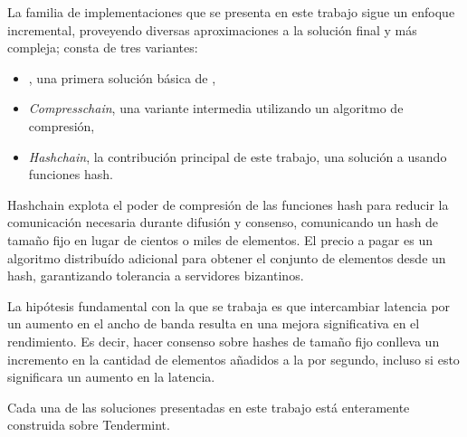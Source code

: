 %
%

La familia de implementaciones que se presenta en este trabajo
sigue un enfoque incremental, proveyendo diversas aproximaciones
a la solución final y más compleja; consta de tres variantes:
\begin{itemize}
  \item \textit{\vanilla}, una primera solución básica de \setchain,
  \item \textit{Compresschain}, una variante intermedia utilizando un algoritmo de compresión,
  \item \textit{Hashchain}, la contribución principal de este trabajo, una solución 
  a \setchain usando funciones hash.
\end{itemize}
%
Hashchain explota el poder de compresión de las funciones hash para reducir la
comunicación necesaria durante difusión y consenso, comunicando un hash de tamaño
fijo en lugar de cientos o miles de elementos.
%
El precio a pagar es un algoritmo distribuído adicional para obtener el conjunto de
elementos desde un hash, garantizando tolerancia a servidores bizantinos.
%

La hipótesis fundamental con la que se trabaja es que intercambiar latencia por un aumento en el
ancho de banda resulta en una mejora significativa en el rendimiento.
%
Es decir, hacer consenso sobre hashes de tamaño fijo conlleva un incremento en la cantidad de elementos
añadidos a la \setchain por segundo, incluso si esto significara un aumento en la latencia.

Cada una de las soluciones presentadas en este trabajo está enteramente construida sobre Tendermint.



